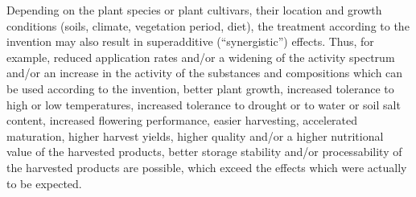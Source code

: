 \documentclass[11pt,a4paper]{article}
\begin{document}
Depending on the plant species or plant cultivars, their location and growth conditions (soils, climate, vegetation period, diet), the treatment according to the invention may also result in superadditive (“synergistic”) effects. Thus, for example, reduced application rates and/or a widening of the activity spectrum and/or an increase in the activity of the substances and compositions which can be used according to the invention, better plant growth, increased tolerance to high or low temperatures, increased tolerance to drought or to water or soil salt content, increased flowering performance, easier harvesting, accelerated maturation, higher harvest yields, higher quality and/or a higher nutritional value of the harvested products, better storage stability and/or processability of the harvested products are possible, which exceed the effects which were actually to be expected.
\end{document}

